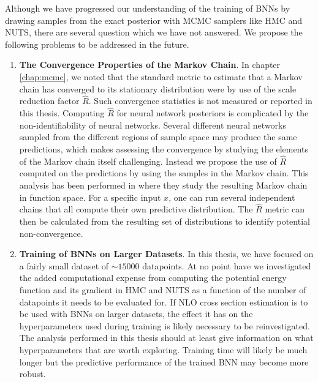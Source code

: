 Although we have progressed our understanding of the training of BNNs by drawing samples from the exact posterior with MCMC samplers like HMC and NUTS, there are several question which we have not answered. We propose the following problems to be addressed in the future.
\begin{enumerate}
    \item \textbf{The Convergence Properties of the Markov Chain}. In chapter \ref{chap:mcmc}, we noted that the standard metric to estimate that a Markov chain has converged to its stationary distribution were by use of the scale reduction factor $\hat{R}$. Such convergence statistics is not measured or reported in this thesis. Computing $\hat{R}$ for neural network posteriors is complicated by the non-identifiability of neural networks. Several different neural networks sampled from the different regions of sample space may produce the same predictions, which makes assessing the convergence by studying the elements of the Markov chain itself challenging. Instead we propose the use of $\hat{R}$ computed on the predictions by using the samples in the Markov chain. This analysis has been performed in \cite{google_bnn_posteriors} where they study the resulting Markov chain in function space. For a specific input $x$, one can run several independent chains that all compute their own predictive distribution. The $\hat{R}$ metric can then be calculated from the resulting set of distributions to identify potential non-convergence.
    \item \textbf{Training of BNNs on Larger Datasets}. In this thesis, we have focused on a fairly small dataset of $\sim 15000$ datapoints. At no point have we investigated the added computational expense from computing the potential energy function and its gradient in HMC and NUTS as a function of the number of datapoints it needs to be evaluated for. If NLO cross section estimation is to be used with BNNs on larger datasets, the effect it has on the hyperparameters used during training is likely necessary to be reinvestigated. The analysis performed in this thesis should at least give information on what hyperparameters that are worth exploring. Training time will likely be much longer but the predictive performance of the trained BNN may become more robust.

\end{enumerate}

